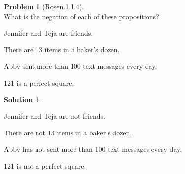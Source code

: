 \documentclass{article}
\theoremstyle{definition}
\newtheorem*{problem}{Problem}
\newtheorem*{solution}{Solution}
\begin{document}
\begin{problem}[Rosen.1.1.4]\ \\
What is the negation of each of these propositions?
\begin{compactenum}
\renewcommand{\theenumi}{\alph{enumi}}
\item Jennifer and Teja are friends.
\item There are 13 items in a baker's dozen.
\item Abby sent more than 100 text messages every day.
\item 121 is a perfect square.
\end{compactenum}
\end{problem}

\begin{solution}\ \\
\begin{compactenum}
\renewcommand{\theenumi}{\alph{enumi}}
\item Jennifer and Teja are not friends.
\item There are not 13 items in a baker's dozen.
\item Abby has not sent more than 100 text messages every day.
\item 121 is not a perfect square.
\end{compactenum}
\end{solution}
\end{document}
